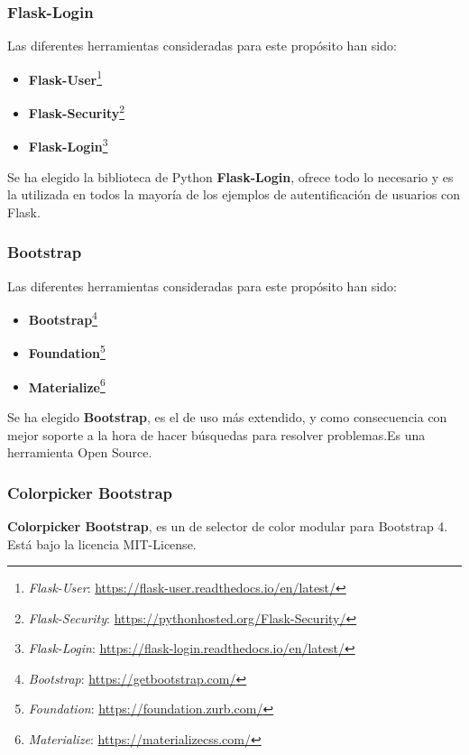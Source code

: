 \subsubsection{Flask-Login}
Las diferentes herramientas consideradas para este propósito han sido:

\begin{itemize}
\item \textbf{Flask-User}\footnote{\textsl{Flask-User}: \url{https://flask-user.readthedocs.io/en/latest/}}
\item \textbf{Flask-Security}\footnote{\textsl{Flask-Security}: \url{https://pythonhosted.org/Flask-Security/}}
\item \textbf{Flask-Login}\footnote{\textsl{Flask-Login}: \url{https://flask-login.readthedocs.io/en/latest/}}
\end{itemize}

Se ha elegido la biblioteca de Python \textbf{Flask-Login}, ofrece todo lo necesario y es la utilizada en todos la mayoría de los ejemplos de autentificación de usuarios con Flask.

\subsubsection{Bootstrap}
Las diferentes herramientas consideradas para este propósito han sido:

\begin{itemize}
\item \textbf{Bootstrap}\footnote{\textsl{Bootstrap}: \url{https://getbootstrap.com/}}
\item \textbf{Foundation}\footnote{\textsl{Foundation}: \url{https://foundation.zurb.com/}}
\item \textbf{Materialize}\footnote{\textsl{Materialize}: \url{https://materializecss.com/}}
\end{itemize}

Se ha elegido \textbf{Bootstrap}, es  el  de uso más extendido, y como consecuencia con mejor soporte a la hora de hacer búsquedas para resolver problemas.Es una herramienta Open Source.


\subsubsection{Colorpicker Bootstrap}

\textbf{Colorpicker Bootstrap},  es un  de selector de color modular para Bootstrap 4. Está bajo la licencia MIT-License.


